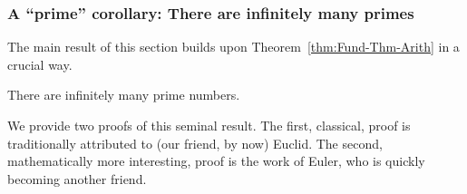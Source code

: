 \subsubsection{A ``prime'' corollary: There are infinitely many primes}
\label{sec:infinite-primes}

The main result of this section builds upon Theorem~\ref{thm:Fund-Thm-Arith} in a crucial way.

\begin{prop}
\label{thm:infinite-primes}
There are infinitely many prime numbers.
\end{prop}

We provide two proofs of this seminal result.  The first, classical, proof is traditionally attributed to (our friend, by now) Euclid.  The second, mathematically more interesting, proof is the work of Euler, who is quickly becoming another friend.

 

